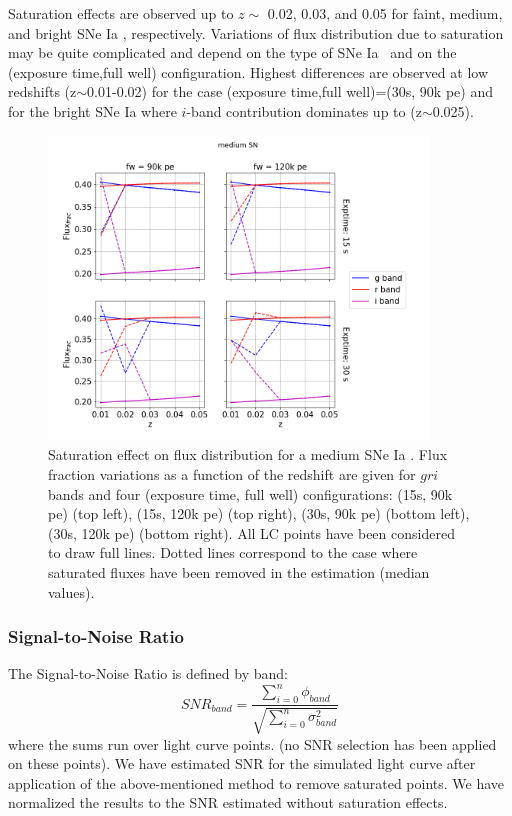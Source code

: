 \documentclass[\docopts]{\docclass}
\newcommand{\sne}{{SNe Ia }}
\newcommand{\pe}{{pe}}
\begin{document}
Saturation effects are observed up to $z\sim$ 0.02, 0.03, and 0.05 for faint, medium, and bright \sne, respectively. Variations of flux distribution due to saturation may be quite complicated and depend on the type of \sne~and on the (exposure time,full well) configuration. Highest differences are observed at low redshifts (z$\sim$0.01-0.02) for the case (exposure time,full well)=(30s, 90k \pe) and for the bright \sne where $i$-band contribution dominates up to (z$\sim$0.025).

\begin{figure}[htbp]
\begin{center}
  \includegraphics[width=0.9\textwidth]{Flux_medium.png}
 \caption{Saturation effect on flux distribution for a medium \sne. Flux fraction variations as a function of the redshift are given for $gri$ bands and four (exposure time, full well) configurations: (15s, 90k \pe) (top left),  (15s, 120k \pe) (top right), (30s, 90k \pe) (bottom left),  (30s, 120k \pe) (bottom right). All LC points have been considered to draw full lines. Dotted lines correspond to the case where saturated fluxes have been removed in the estimation (median values).}\label{fig:fluxmedium}
\end{center}
\end{figure}

\subsubsection{Signal-to-Noise Ratio}
The Signal-to-Noise Ratio is defined by band:
\begin{equation}
 SNR_{band} = \frac{\displaystyle \sum_{i=0}^{n}  \phi_{band}}{\sqrt{\displaystyle \sum_{i=0}^{n}  \sigma^2_{band}}}
\end{equation}
where the sums run over light curve points. (no SNR selection has been applied on these points). We have estimated SNR for the simulated light curve after application of the above-mentioned method to remove saturated points. We have normalized the results to the SNR estimated without saturation effects. 
\end{document}
